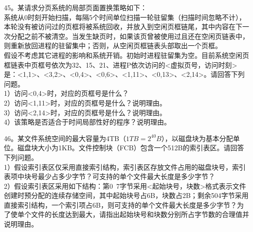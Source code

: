 45。某请求分页系统的局部页面置换策略如下：\\
系统从0时刻开始扫描，每隔5个时间单位扫描一轮驻留集（扫描时间忽略不计），本轮没有被访问过的页框将被系统回收，并放入到空闲页框链尾，其中内容在下一次分配之前不被清空。当发生缺页时，如果该页曾被使用过且还在空闲页链表中，则重新放回进程的驻留集中；否则，从空闲页框链表头部取出一个页框。\\

假设不考虑其它进程的影响和系统开销。初始时进程驻留集为空。目前系统空闲页框链表中页框号依次为32、15、21、进程P依次访问的<虚拟页号，访问时刻>是：<1,1>、<3,2>、<0,4>、<0,6>、<1,11>、<0,13>、<2,14>。请回答下列问题。\\
1）访问<0,4>时，对应的页框号是什么？\\
2）访问<1,11>时，对应的页框号是什么？说明理由。\\
3）访问<2,14>时，对应的页框号是什么？说明理由。\\
4）该策略是否适合于时间局部性好的程序？说明理由。

46。某文件系统空间的最大容量为4TB（$1TB=2^{40}B$），以磁盘块为基本分配单位。磁盘块大小为1KB。文件控制块（FCB）包含一个512B的索引表区。请回答下列问题。 \\
1）假设索引表区仅采用直接索引结构，索引表区存放文件占用的磁盘块号，索引表项中块号最少占多少字节？可支持的单个文件最大长度是多少字节？ \\
2）假设索引表区采用如下结构：第0~7字节采用<起始块号，块数>格式表示文件创建时预分配的连续存储空间，其中起始块号占6B，块数占2B；剩余504字节采用直接索引结构，一个索引项占6B，则可支持的单个文件最大长度是多少字节？为了使单个文件的长度达到最大，请指出起始块号和块数分别所占字节数的合理值并说明理由。

